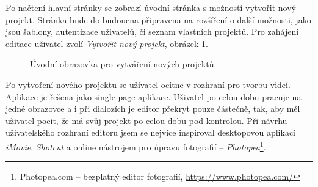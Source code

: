 Po načtení hlavní stránky se zobrazí úvodní stránka s možností vytvořit nový projekt. Stránka bude do budoucna připravena na rozšíření o další možnosti, jako jsou šablony, autentizace uživatelů, či seznam vlastních projektů. Pro zahájení editace uživatel zvolí \textit{Vytvořit nový projekt}, obrázek \ref{img:novy-projekt}.
\begin{figure}[h]
	\centering
	\caption{Úvodní obrazovka pro vytváření nových projektů.}\label{img:novy-projekt}
\end{figure}

Po vytvoření nového projektu se uživatel ocitne v rozhraní pro tvorbu videí. Aplikace je řešena jako single page aplikace. Uživatel po celou dobu pracuje na jedné obrazovce a i při dialozích je editor překryt pouze částečně, tak, aby měl uživatel pocit, že má svůj projekt po celou dobu pod kontrolou. Při návrhu uživatelského rozhraní editoru jsem se nejvíce inspiroval desktopovou aplikací \textit{iMovie}, \textit{Shotcut} a online nástrojem pro úpravu fotografií -- \textit{Photopea}\footnote{Photopea.com -- bezplatný editor fotografií, \url{https://www.photopea.com/}}.

